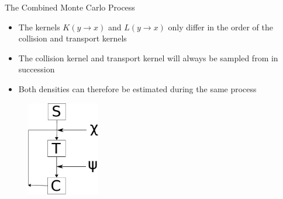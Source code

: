 \documentclass{beamer}
\begin{document}
\begin{frame}{The Combined Monte Carlo Process}

  \begin{itemize}
    \item The kernels $K(y \to x)$ and $L(y \to x)$ only differ in the order
      of the collision and transport kernels
      \medskip
    \item The collision kernel and transport kernel will always be sampled
      from in succession
      \medskip
    \item Both densities can therefore be estimated during the same process
  \end{itemize}
  
  \begin{figure}[h!]
    \begin{center}
      \includegraphics[width=1.25in]{../document/chapters/random_walk_process_derivation/random_walk_process.pdf}
    \end{center}
  \end{figure}


\end{frame}

\end{document}
